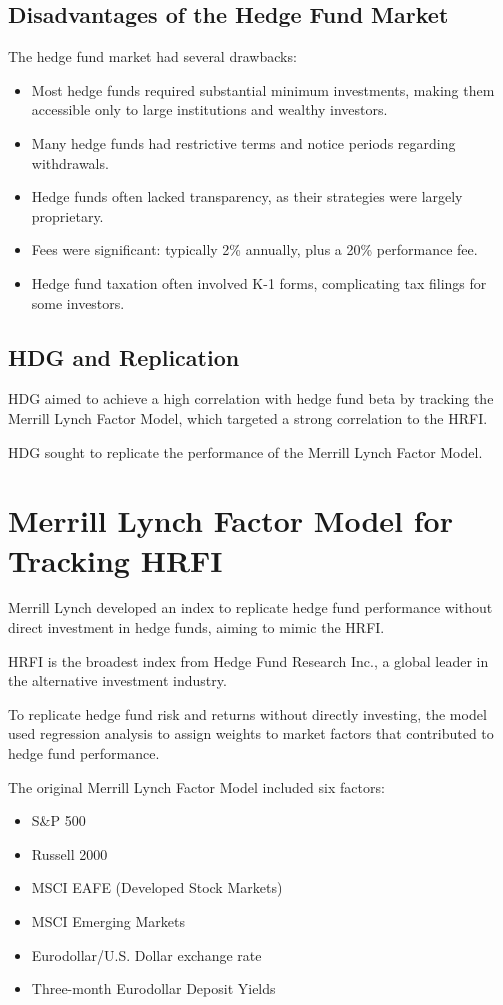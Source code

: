 \documentclass{article}
\begin{document}
\subsection{Disadvantages of the Hedge Fund Market}
The hedge fund market had several drawbacks:
\begin{itemize}
    \item Most hedge funds required substantial minimum investments, making them accessible only to large institutions and wealthy investors.
    \item Many hedge funds had restrictive terms and notice periods regarding withdrawals.
    \item Hedge funds often lacked transparency, as their strategies were largely proprietary.
    \item Fees were significant: typically 2\% annually, plus a 20\% performance fee.
    \item Hedge fund taxation often involved K-1 forms, complicating tax filings for some investors.
\end{itemize}

\subsection{HDG and Replication}
HDG aimed to achieve a high correlation with hedge fund beta by tracking the Merrill Lynch Factor Model, which targeted a strong correlation to the HRFI.

HDG sought to replicate the performance of the Merrill Lynch Factor Model.

\section{Merrill Lynch Factor Model for Tracking HRFI}
Merrill Lynch developed an index to replicate hedge fund performance without direct investment in hedge funds, aiming to mimic the HRFI.

HRFI is the broadest index from Hedge Fund Research Inc., a global leader in the alternative investment industry.

To replicate hedge fund risk and returns without directly investing, the model used regression analysis to assign weights to market factors that contributed to hedge fund performance.

The original Merrill Lynch Factor Model included six factors:
\begin{itemize}
    \item S\&P 500
    \item Russell 2000
    \item MSCI EAFE (Developed Stock Markets)
    \item MSCI Emerging Markets
    \item Eurodollar/U.S. Dollar exchange rate
    \item Three-month Eurodollar Deposit Yields
\end{itemize}
\end{document}

